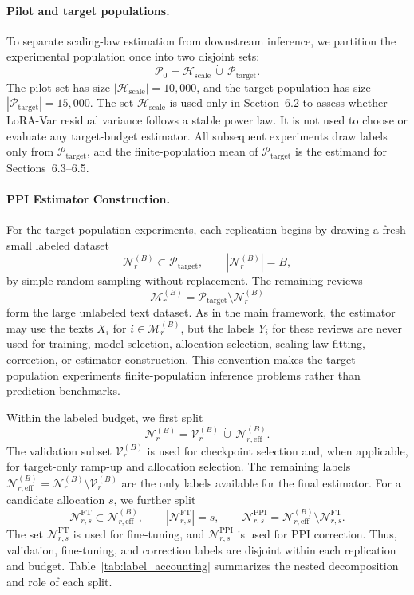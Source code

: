 \documentclass[11pt]{article}
\begin{document}
\paragraph{Pilot and target populations.}
To separate scaling-law estimation from downstream inference, we partition the experimental
population once into two disjoint sets:
\[
    \mathcal{P}_0=\mathcal{H}_{\mathrm{scale}}\,\dot\cup\,\mathcal{P}_{\mathrm{target}}.
\]
The pilot set has size $|\mathcal{H}_{\mathrm{scale}}|=10{,}000$, and the target population has
size $|\mathcal{P}_{\mathrm{target}}|=15{,}000$. The set
$\mathcal{H}_{\mathrm{scale}}$ is used only in Section~6.2 to assess whether LoRA-Var residual
variance follows a stable power law. It is not used to choose or evaluate any target-budget
estimator. All subsequent experiments draw labels only from
$\mathcal{P}_{\mathrm{target}}$, and the finite-population mean of
$\mathcal{P}_{\mathrm{target}}$ is the estimand for Sections~6.3--6.5.

\paragraph{PPI Estimator Construction.}
For the target-population experiments, each replication begins by drawing a fresh small labeled
dataset
\[
    \mathcal{N}_r^{(B)}\subset\mathcal{P}_{\mathrm{target}},\qquad
    |\mathcal{N}_r^{(B)}|=B,
\]
by simple random sampling without replacement. The remaining reviews
\[
    \mathcal{M}_r^{(B)}
    =
    \mathcal{P}_{\mathrm{target}}\setminus\mathcal{N}_r^{(B)}
\]
form the large unlabeled text dataset. As in the main framework, the estimator may use the texts
$X_i$ for $i\in\mathcal{M}_r^{(B)}$, but the labels $Y_i$ for these reviews are never used for
training, model selection, allocation selection, scaling-law fitting, correction, or estimator
construction. This convention makes the target-population experiments finite-population
inference problems rather than prediction benchmarks.

Within the labeled budget, we first split
\[
    \mathcal{N}_r^{(B)}
    =
    \mathcal{V}_r^{(B)}\,\dot\cup\,\mathcal{N}_{r,\mathrm{eff}}^{(B)} .
\]
The validation subset $\mathcal{V}_r^{(B)}$ is used for checkpoint selection and, when
applicable, for target-only ramp-up and allocation selection. The remaining labels
$\mathcal{N}_{r,\mathrm{eff}}^{(B)}
=\mathcal{N}_r^{(B)}\setminus\mathcal{V}_r^{(B)}$ are the only labels available for the final
estimator.
For a candidate allocation $s$, we further split
\[
    \mathcal{N}_{r,s}^{\mathrm{FT}}\subset \mathcal{N}_{r,\mathrm{eff}}^{(B)},
    \qquad |\mathcal{N}_{r,s}^{\mathrm{FT}}|=s,
    \qquad
    \mathcal{N}_{r,s}^{\mathrm{PPI}}
    =
    \mathcal{N}_{r,\mathrm{eff}}^{(B)}
    \setminus
    \mathcal{N}_{r,s}^{\mathrm{FT}}.
\]
The set $\mathcal{N}_{r,s}^{\mathrm{FT}}$ is used for fine-tuning, and
$\mathcal{N}_{r,s}^{\mathrm{PPI}}$ is used for PPI correction. Thus, validation, fine-tuning, and
correction labels are disjoint within each replication and budget. Table~\ref{tab:label_accounting}
summarizes the nested decomposition and role of each split.
\end{document}
